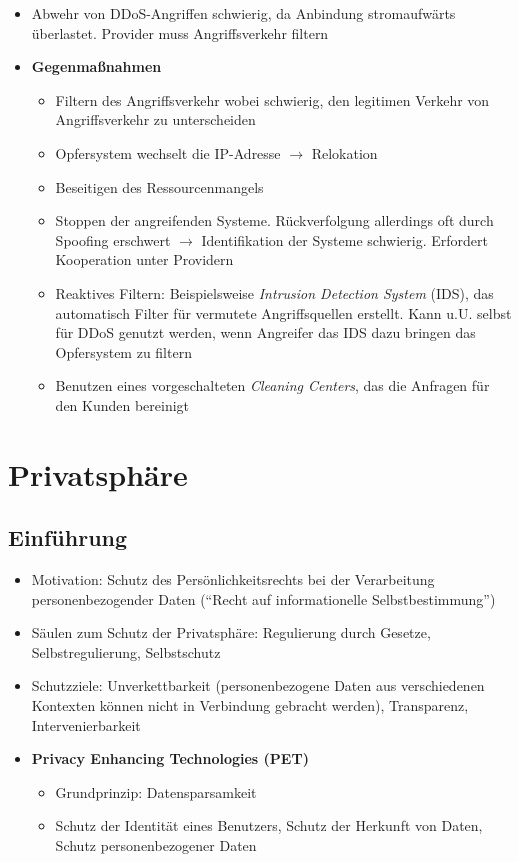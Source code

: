 \begin{itemize}
	\item Abwehr von DDoS-Angriffen schwierig, da Anbindung stromaufwärts überlastet. Provider muss Angriffsverkehr filtern
	\item \textbf{Gegenmaßnahmen}
	\begin{itemize}
		\item Filtern des Angriffsverkehr wobei schwierig, den legitimen Verkehr von Angriffsverkehr zu unterscheiden
		\item Opfersystem wechselt die IP-Adresse \(\rightarrow\) Relokation
		\item Beseitigen des Ressourcenmangels
		\item Stoppen der angreifenden Systeme. Rückverfolgung allerdings oft durch Spoofing erschwert \(\rightarrow\) Identifikation der Systeme schwierig. Erfordert Kooperation unter Providern
		\item Reaktives Filtern: Beispielsweise \textit{Intrusion Detection System} (IDS), das automatisch Filter für vermutete Angriffsquellen erstellt. Kann u.U. selbst für DDoS genutzt werden, wenn Angreifer das IDS dazu bringen das Opfersystem zu filtern
		\item Benutzen eines vorgeschalteten \textit{Cleaning Centers}, das die Anfragen für den Kunden bereinigt
	\end{itemize}
\end{itemize}



\section{Privatsphäre}

\subsection{Einführung}
\begin{itemize}
	\item Motivation: Schutz des Persönlichkeitsrechts bei der Verarbeitung personenbezogender Daten ("`Recht auf informationelle Selbstbestimmung"')
	\item Säulen zum Schutz der Privatsphäre: Regulierung durch Gesetze, Selbstregulierung, Selbstschutz
	\item Schutzziele: Unverkettbarkeit (personenbezogene Daten aus verschiedenen Kontexten können nicht in Verbindung gebracht werden), Transparenz, Intervenierbarkeit
	\item \textbf{Privacy Enhancing Technologies (PET)}
	\begin{itemize}
		\item Grundprinzip: Datensparsamkeit
		\item Schutz der Identität eines Benutzers, Schutz der Herkunft von Daten, Schutz personenbezogener Daten
	\end{itemize}
\end{itemize}


